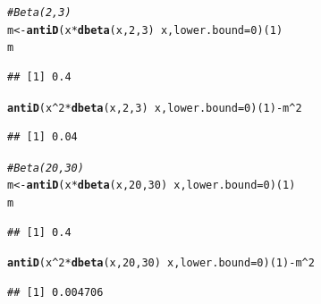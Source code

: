 \documentclass[twoside]{book}\usepackage[]{graphicx}\usepackage[]{xcolor}
\makeatletter
\newcommand{\hlnum}[1]{\textcolor[rgb]{0.686,0.059,0.569}{#1}}%
\newcommand{\hlcom}[1]{\textcolor[rgb]{0.678,0.584,0.686}{\textit{#1}}}%
\newcommand{\hlopt}[1]{\textcolor[rgb]{0,0,0}{#1}}%
\newcommand{\hlstd}[1]{\textcolor[rgb]{0.345,0.345,0.345}{#1}}%
\newcommand{\hlkwb}[1]{\textcolor[rgb]{0.69,0.353,0.396}{#1}}%
\newcommand{\hlkwc}[1]{\textcolor[rgb]{0.333,0.667,0.333}{#1}}%
\newcommand{\hlkwd}[1]{\textcolor[rgb]{0.737,0.353,0.396}{\textbf{#1}}}%
\newenvironment{kframe}{%
 \def\at@end@of@kframe{}%
 \ifinner\ifhmode%
  \def\at@end@of@kframe{\end{minipage}}%
  \begin{minipage}{\columnwidth}%
 \fi\fi%
 \def\FrameCommand##1{\hskip\@totalleftmargin \hskip-\fboxsep
 \colorbox{shadecolor}{##1}\hskip-\fboxsep
     \hskip-\linewidth \hskip-\@totalleftmargin \hskip\columnwidth}%
 \MakeFramed {\advance\hsize-\width
   \@totalleftmargin\z@ \linewidth\hsize
   \@setminipage}}%
 {\par\unskip\endMakeFramed%
 \at@end@of@kframe}
\newenvironment{knitrout}{}{} %
\makeatother
\begin{document}
\begin{solution}
\begin{knitrout}
\color{fgcolor}\begin{kframe}
\begin{alltt}
\hlcom{# Beta(2,3)}
\hlstd{m} \hlkwb{<-} \hlkwd{antiD}\hlstd{( x} \hlopt{*} \hlkwd{dbeta}\hlstd{(x,}\hlnum{2}\hlstd{,}\hlnum{3}\hlstd{)} \hlopt{~} \hlstd{x,} \hlkwc{lower.bound} \hlstd{=} \hlnum{0}\hlstd{)(}\hlnum{1}\hlstd{)}
\hlstd{m}
\end{alltt}
\begin{verbatim}
## [1] 0.4
\end{verbatim}
\begin{alltt}
\hlkwd{antiD}\hlstd{( x}\hlopt{^}\hlnum{2} \hlopt{*} \hlkwd{dbeta}\hlstd{(x,}\hlnum{2}\hlstd{,}\hlnum{3}\hlstd{)} \hlopt{~} \hlstd{x,} \hlkwc{lower.bound} \hlstd{=} \hlnum{0} \hlstd{)(}\hlnum{1}\hlstd{)} \hlopt{-} \hlstd{m}\hlopt{^}\hlnum{2}
\end{alltt}
\begin{verbatim}
## [1] 0.04
\end{verbatim}
\end{kframe}
\end{knitrout}
\begin{knitrout}
\color{fgcolor}\begin{kframe}
\begin{alltt}
\hlcom{# Beta(20,30)}
\hlstd{m} \hlkwb{<-} \hlkwd{antiD}\hlstd{( x} \hlopt{*} \hlkwd{dbeta}\hlstd{(x,}\hlnum{20}\hlstd{,}\hlnum{30}\hlstd{)} \hlopt{~} \hlstd{x,} \hlkwc{lower.bound} \hlstd{=} \hlnum{0}\hlstd{)(}\hlnum{1}\hlstd{)}
\hlstd{m}
\end{alltt}
\begin{verbatim}
## [1] 0.4
\end{verbatim}
\begin{alltt}
\hlkwd{antiD}\hlstd{( x}\hlopt{^}\hlnum{2} \hlopt{*} \hlkwd{dbeta}\hlstd{(x,}\hlnum{20}\hlstd{,}\hlnum{30}\hlstd{)} \hlopt{~} \hlstd{x,} \hlkwc{lower.bound} \hlstd{=} \hlnum{0} \hlstd{)(}\hlnum{1}\hlstd{)} \hlopt{-} \hlstd{m}\hlopt{^}\hlnum{2}
\end{alltt}
\begin{verbatim}
## [1] 0.004706
\end{verbatim}
\end{kframe}
\end{knitrout}
\begin{knitrout}
\color{fgcolor}\begin{kframe}

\end{kframe}
\end{knitrout}
\end{solution}
\end{document}
